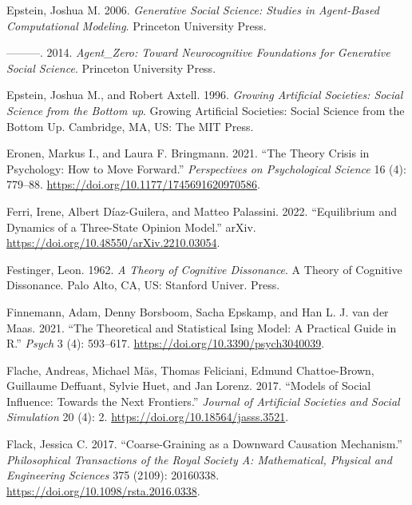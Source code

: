 \documentclass[
  a4paper,
  DIV=11,
  numbers=noendperiod]{scrreprt}
\newlength{\cslhangindent}
\newlength{\cslentryspacingunit} %
\newenvironment{CSLReferences}[2] %
 {%
  \setlength{\parindent}{0pt}
  \ifodd #1
  \let\oldpar\par
  \def\par{\hangindent=\cslhangindent\oldpar}
  \fi
  \setlength{\parskip}{#2\cslentryspacingunit}
 }%
 {}
\begin{document}
\begin{CSLReferences}{1}{0}
\leavevmode{}%
Epstein, Joshua M. 2006. \emph{Generative {Social Science}: {Studies} in
{Agent-Based Computational Modeling}}. {Princeton University Press}.

\leavevmode{}%
---------. 2014. \emph{Agent\_{Zero}: {Toward Neurocognitive
Foundations} for {Generative Social Science}}. {Princeton University
Press}.

\leavevmode{}%
Epstein, Joshua M., and Robert Axtell. 1996. \emph{Growing Artificial
Societies: {Social} Science from the Bottom up}. Growing Artificial
Societies: {Social} Science from the Bottom Up. {Cambridge, MA, US}:
{The MIT Press}.

\leavevmode{}%
Eronen, Markus I., and Laura F. Bringmann. 2021. {``The {Theory Crisis}
in {Psychology}: {How} to {Move Forward}.''} \emph{Perspectives on
Psychological Science} 16 (4): 779--88.
\url{https://doi.org/10.1177/1745691620970586}.

\leavevmode{}%
Ferri, Irene, Albert Díaz-Guilera, and Matteo Palassini. 2022.
{``Equilibrium and Dynamics of a Three-State Opinion Model.''} {arXiv}.
\url{https://doi.org/10.48550/arXiv.2210.03054}.

\leavevmode{}%
Festinger, Leon. 1962. \emph{A Theory of Cognitive Dissonance}. A Theory
of Cognitive Dissonance. {Palo Alto, CA, US}: {Stanford Univer. Press}.

\leavevmode{}%
Finnemann, Adam, Denny Borsboom, Sacha Epskamp, and Han L. J. van der
Maas. 2021. {``The Theoretical and Statistical Ising Model: A Practical
Guide in R.''} \emph{Psych} 3 (4): 593--617.
\url{https://doi.org/10.3390/psych3040039}.

\leavevmode{}%
Flache, Andreas, Michael Mäs, Thomas Feliciani, Edmund Chattoe-Brown,
Guillaume Deffuant, Sylvie Huet, and Jan Lorenz. 2017. {``Models of
{Social Influence}: {Towards} the {Next Frontiers}.''} \emph{Journal of
Artificial Societies and Social Simulation} 20 (4): 2.
\url{https://doi.org/10.18564/jasss.3521}.

\leavevmode{}%
Flack, Jessica C. 2017. {``Coarse-Graining as a Downward Causation
Mechanism.''} \emph{Philosophical Transactions of the Royal Society A:
Mathematical, Physical and Engineering Sciences} 375 (2109): 20160338.
\url{https://doi.org/10.1098/rsta.2016.0338}.


\end{CSLReferences}
\end{document}
